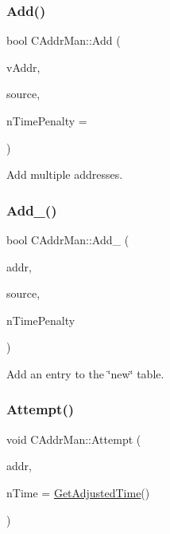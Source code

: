 \subsubsection{\texorpdfstring{Add()}{Add()}\hspace{0.1cm}{\footnotesize\ttfamily [2/2]}}
{\footnotesize\ttfamily bool C\+Addr\+Man\+::\+Add (\begin{DoxyParamCaption}\item[{const std\+::vector$<$ \mbox{\hyperlink{class_c_address}{C\+Address}} $>$ \&}]{v\+Addr,  }\item[{const \mbox{\hyperlink{class_c_net_addr}{C\+Net\+Addr}} \&}]{source,  }\item[{int64\+\_\+t}]{n\+Time\+Penalty = {} }\end{DoxyParamCaption})\hspace{0.3cm}{\ttfamily [inline]}}



Add multiple addresses. 

\mbox{\label{class_c_addr_man_a9dd6df8b1904548a86054d19d4a90724}} 
\subsubsection{\texorpdfstring{Add\+\_\+()}{Add\_()}}
{\footnotesize\ttfamily bool C\+Addr\+Man\+::\+Add\+\_\+ (\begin{DoxyParamCaption}\item[{const \mbox{\hyperlink{class_c_address}{C\+Address}} \&}]{addr,  }\item[{const \mbox{\hyperlink{class_c_net_addr}{C\+Net\+Addr}} \&}]{source,  }\item[{int64\+\_\+t}]{n\+Time\+Penalty }\end{DoxyParamCaption})\hspace{0.3cm}{\ttfamily [protected]}}



Add an entry to the \char`\"{}new\char`\"{} table. 

\mbox{\label{class_c_addr_man_afcddc2573121065177dc981cea710789}} 
\subsubsection{\texorpdfstring{Attempt()}{Attempt()}}
{\footnotesize\ttfamily void C\+Addr\+Man\+::\+Attempt (\begin{DoxyParamCaption}\item[{const \mbox{\hyperlink{class_c_service}{C\+Service}} \&}]{addr,  }\item[{int64\+\_\+t}]{n\+Time = {\ttfamily \mbox{\hyperlink{timedata_8h_a09f81b9c7650f898cf3cf305b87547e6}{Get\+Adjusted\+Time}}()} }\end{DoxyParamCaption})\hspace{0.3cm}{\ttfamily [inline]}}



